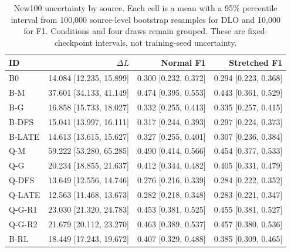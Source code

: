 \begin{table}[htbp]\centering\small
\caption{New100 uncertainty by source. Each cell is a mean with a 95\% percentile interval from 100,000 source-level bootstrap resamples for DLO and 10,000 for F1. Conditions and four draws remain grouped. These are fixed-checkpoint intervals, not training-seed uncertainty.}\label{tab:ci}
\setlength{\tabcolsep}{3pt}\begin{tabular}{@{}lrrr@{}}\toprule
ID & $\Delta L$ & Normal F1 & Stretched F1 \\ \midrule
B0 & 14.084 [12.235, 15.899] & 0.300 [0.232, 0.372] & 0.294 [0.223, 0.368] \\
B-M & 37.601 [34.133, 41.149] & 0.474 [0.395, 0.553] & 0.443 [0.361, 0.529] \\
B-G & 16.858 [15.733, 18.027] & 0.332 [0.255, 0.413] & 0.335 [0.257, 0.415] \\
B-DFS & 15.041 [13.997, 16.111] & 0.317 [0.244, 0.393] & 0.297 [0.224, 0.373] \\
B-LATE & 14.613 [13.615, 15.627] & 0.327 [0.255, 0.401] & 0.307 [0.236, 0.384] \\
Q-M & 59.222 [53.280, 65.285] & 0.490 [0.414, 0.566] & 0.454 [0.377, 0.533] \\
Q-G & 20.234 [18.855, 21.637] & 0.412 [0.344, 0.482] & 0.405 [0.331, 0.479] \\
Q-DFS & 13.649 [12.556, 14.746] & 0.276 [0.216, 0.339] & 0.284 [0.222, 0.352] \\
Q-LATE & 12.563 [11.468, 13.673] & 0.282 [0.218, 0.348] & 0.283 [0.221, 0.347] \\
Q-G-R1 & 23.030 [21.320, 24.783] & 0.453 [0.381, 0.525] & 0.455 [0.381, 0.527] \\
Q-G-R2 & 21.679 [20.112, 23.270] & 0.463 [0.389, 0.537] & 0.457 [0.380, 0.536] \\
B-RL & 18.449 [17.243, 19.672] & 0.407 [0.329, 0.488] & 0.385 [0.309, 0.465] \\
\bottomrule\end{tabular}\end{table}
